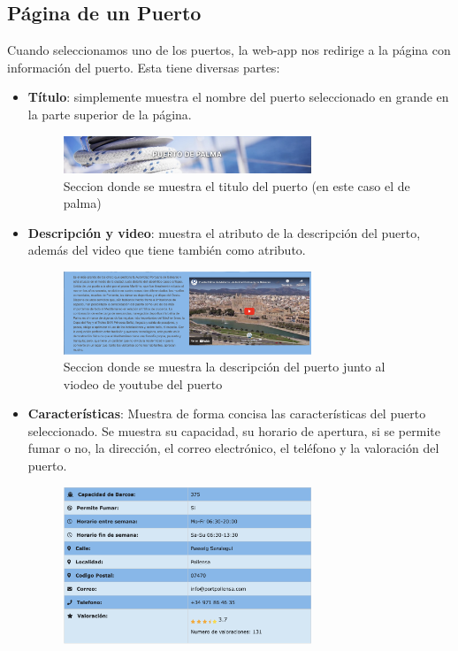 \documentclass{article}
\begin{document}
\subsection{Página de un Puerto}
Cuando seleccionamos uno de los puertos, la web-app nos redirige a la página con información del puerto. Esta tiene diversas partes:
\begin{itemize}
    \item \textbf{Título}: simplemente muestra el nombre del puerto seleccionado en grande en la parte superior de la página.
    \begin{figure}[ht]
        \centering
        \includegraphics[width=0.7\textwidth]{images/tituloPuerto.png}
        \caption{Seccion donde se muestra el titulo del puerto (en este caso el de palma)}
    \end{figure}
    \item \textbf{Descripción y video}: muestra el atributo de la descripción del puerto, además del video que tiene también como atributo.
    \begin{figure}[ht]
        \centering
        \includegraphics[width=0.7\textwidth]{images/descVid.png}
        \caption{Seccion donde se muestra la descripción del puerto junto al viodeo de youtube del puerto}
    \end{figure}
    \item \textbf{Características}: Muestra de forma concisa las características del puerto seleccionado. Se muestra su capacidad, su horario de apertura, si se permite fumar o no, la dirección, el correo electrónico, el teléfono y la valoración del puerto.
    \begin{figure}[ht]
        \centering
        \includegraphics[width=0.7\textwidth]{images/caracteristicas.png}

\end{figure}
\end{itemize}
\end{document}
